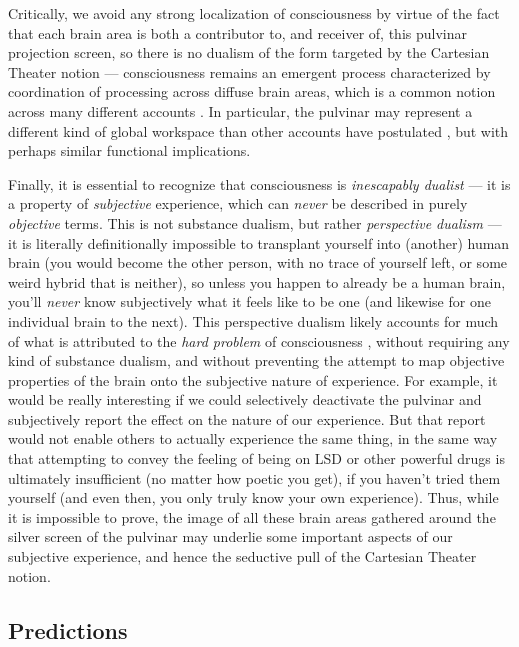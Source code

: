 \documentclass[11pt,twoside]{article}
\newif\myifpdf
\begin{document}
Critically, we avoid any strong localization of consciousness by virtue of the fact that each brain area is both a contributor to, and receiver of, this pulvinar projection screen, so there is no dualism of the form targeted by the Cartesian Theater notion --- consciousness remains an emergent process characterized by coordination of processing across diffuse brain areas, which is a common notion across many different accounts \cite{Baars83,Baars02,DehaeneNaccache01,CrickKoch03,Tononi04,Lamme06,SethDienesCleeremansEtAl08}.  In particular, the pulvinar may represent a different kind of global workspace than other accounts have postulated \cite{Baars02,DehaeneNaccache01}, but with perhaps similar functional implications.

Finally, it is essential to recognize that consciousness is {\em inescapably dualist} --- it is a property of {\em subjective} experience, which can {\em never} be described in purely {\em objective} terms.  This is not substance dualism, but rather {\em perspective dualism} --- it is literally definitionally impossible to transplant yourself into (another) human brain (you would become the other person, with no trace of yourself left, or some weird hybrid that is neither), so unless you happen to already be a human brain, you'll {\em never} know subjectively what it feels like to be one (and likewise for one individual brain to the next).  This perspective dualism likely accounts for much of what is attributed to the {\em hard problem} of consciousness \cite{Chalmers95}, without requiring any kind of substance dualism, and without preventing the attempt to map objective properties of the brain onto the subjective nature of experience.  For example, it would be really interesting if we could selectively deactivate the pulvinar and subjectively report the effect on the nature of our experience.  But that report would not enable others to actually experience the same thing, in the same way that attempting to convey the feeling of being on LSD or other powerful drugs is ultimately insufficient (no matter how poetic you get), if you haven't tried them yourself (and even then, you only truly know your own experience).  Thus, while it is impossible to prove, the image of all these brain areas gathered around the silver screen of the pulvinar may underlie some important aspects of our subjective experience, and hence the seductive pull of the Cartesian Theater notion.

\subsection{Predictions}
\end{document}

